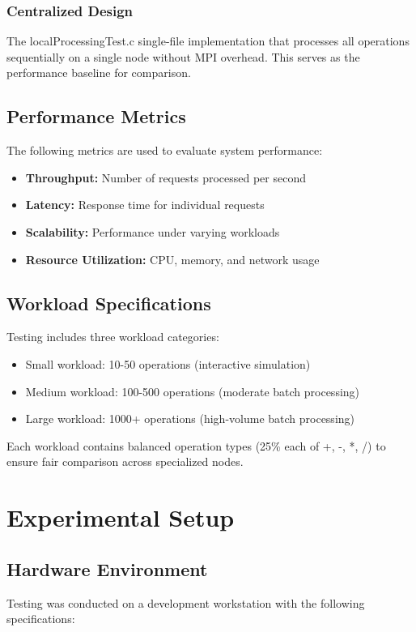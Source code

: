 \documentclass{article}
\begin{document}
\subsubsection{Centralized Design}
The localProcessingTest.c single-file implementation that processes all operations sequentially on a single node without MPI overhead. This serves as the performance baseline for comparison.


\subsection{Performance Metrics}
The following metrics are used to evaluate system performance:

\begin{itemize}
    \item \textbf{Throughput:} Number of requests processed per second
    \item \textbf{Latency:} Response time for individual requests
    \item \textbf{Scalability:} Performance under varying workloads
    \item \textbf{Resource Utilization:} CPU, memory, and network usage
\end{itemize}

\subsection{Workload Specifications}
Testing includes three workload categories:
\begin{itemize}
    \item Small workload: 10-50 operations (interactive simulation)
    \item Medium workload: 100-500 operations (moderate batch processing)
    \item Large workload: 1000+ operations (high-volume batch processing)
\end{itemize}
Each workload contains balanced operation types (25\% each of +, -, *, /) to ensure fair comparison across specialized nodes.


\section{Experimental Setup}

\subsection{Hardware Environment}
Testing was conducted on a development workstation with the following specifications:
\end{document}
